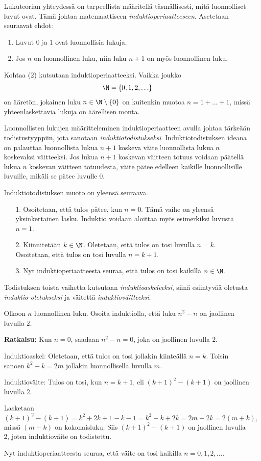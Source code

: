 Lukuteorian yhteydessä on tarpeellista määritellä täsmällisesti, mitä luonnolliset luvut ovat. Tämä johtaa matemaattiseen {\em induktioperiaatteeseen}. Asetetaan seuraavat ehdot:
\begin{enumerate}
\item Luvut $0$ ja $1$ ovat luonnollisia lukuja.
\item Jos $n$ on luonnollinen luku, niin luku $n+1$ on myös luonnollinen luku.
\end{enumerate}
Kohtaa (2) kutsutaan induktioperiaatteeksi. Vaikka joukko
\[
\N = \{0,1,2,\ldots\}
\]
on ääretön, jokainen luku $n\in \N\setminus \{0\}$ on kuitenkin muotoa $n=1+\ldots + 1$, missä yhteenlaskettavia lukuja on äärellisen monta.

Luonnollisten lukujen määritteleminen induktioperiaatteen avulla johtaa tärkeään todistustyyppiin, jota sanotaan {\em induktiotodistukseksi}. Induktiotodistuksen ideana on palauttaa luonnollista lukua $n+1$ koskeva väite luonnollista lukua $n$ koskevaksi väitteeksi. Jos lukua $n+1$ koskevan väitteen totuus voidaan päätellä lukua $n$ koskevan väitteen totuudesta, väite pätee  edelleen kaikille luonnollisille luvuille, mikäli se pätee luvulle $0$. 

Induktiotodistuksen muoto on yleensä seuraava.
\begin{itemize}
\item[1.] Osoitetaan, että tulos pätee, kun $n=0$. Tämä vaihe on yleensä yksinkertainen lasku. Induktio voidaan aloittaa myös esimerkiksi luvusta $n=1$.
\item[2.] Kiinnitetään $k\in \N$. Oletetaan, että tulos on tosi luvulla $n=k$. Osoitetaan, että tulos on tosi luvulla $n=k+1$.
\item[3.] Nyt induktioperiaatteesta seuraa, että tulos on tosi kaikilla $n\in \N$.
\end{itemize}
Todistuksen toista vaihetta kutsutaan {\em induktioaskeleeksi}, siinä esiintyvää oletusta {\em induktio-oletukseksi} ja väitettä {\em induktioväitteeksi}.

\begin{esimerkki}
Olkoon $n$ luonnollinen luku. Osoita induktiolla, että luku $n^2-n$ on jaollinen luvulla $2$.

{\bf Ratkaisu:} 
Kun $n=0$, saadaan $n^2-n=0$, joka on jaollinen luvulla $2$.

Induktioaskel: Oletetaan, että tulos on tosi jollakin kiinteällä $n=k$. Toisin sanoen $k^2-k=2m$ jollakin luonnollisella luvulla $m$. 

Induktioväite: Tulos on tosi, kun $n=k+1$, eli $(k+1)^2-(k+1)$ on jaollinen luvulla $2$.

Lasketaan
\[
(k+1)^2-(k+1)= k^2+2k+1-k-1= k^2-k +2k=2m +2k =2(m+k),
\]
missä $(m+k)$ on kokonaisluku. Siis $(k+1)^2-(k+1)$ on jaollinen luvulla $2$, joten induktioväite on todistettu.

Nyt induktioperiaatteesta seuraa, että väite on tosi kaikilla $n=0,1,2,\ldots$.
\end{esimerkki}

